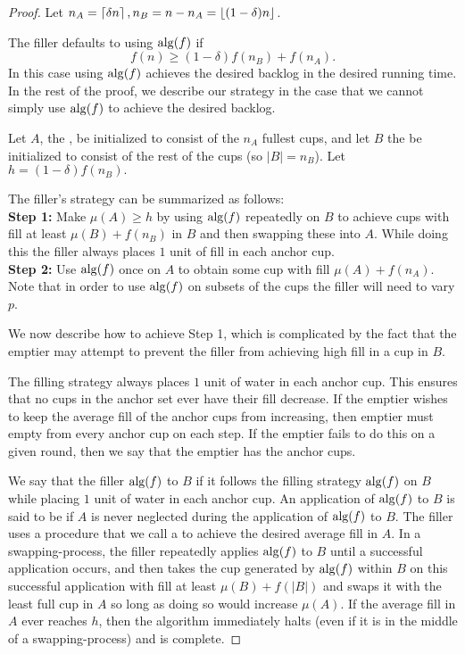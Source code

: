 \begin{proof}
  Let $n_A = \left\lceil \delta n \right\rceil, n_B = n-n_A = \left\lfloor (1-\delta) n \right\rfloor$.

  The filler defaults to using $\operatorname{\text{\textup{alg}}}(f)$ if 
  $$f(n) \ge (1-\delta)f(n_B) + f(n_A).$$ 
  In this case using $\operatorname{\text{\textup{alg}}}(f)$ achieves the desired backlog in
  the desired running time. In the rest of the proof, we describe
  our strategy in the case that we cannot simply use $\operatorname{\text{\textup{alg}}}(f)$ to
  achieve the desired backlog. 

  Let $A$, the , be initialized to consist of
  the $n_A$ fullest cups, and let $B$ the
   be initialized to consist of the rest of
  the cups (so $|B| = n_B$). Let $h = (1-\delta)f(n_B).$

  The filler's strategy can be summarized as follows: \\
  \textbf{Step 1:} Make $\mu(A) \ge h$ by using $\operatorname{\text{\textup{alg}}}(f)$
  repeatedly on $B$ to achieve cups with fill at least $\mu(B) +
  f(n_B)$ in $B$ and then swapping these into $A$. While doing
  this the filler always places $1$ unit of fill in each anchor
  cup.\\
  \textbf{Step 2:} Use $\operatorname{\text{\textup{alg}}}(f)$ once on $A$ to obtain some cup
  with fill $\mu(A)+f(n_A)$.\\
  Note that in order to use $\operatorname{\text{\textup{alg}}}(f)$ on subsets of the cups the
  filler will need to vary $p$.

  We now describe how to achieve Step 1, which is
  complicated by the fact that the emptier may attempt to
  prevent the filler from achieving high fill in a cup
  in $B$.

  The filling strategy always places $1$ unit of water in each
  anchor cup. This ensures that no cups in the anchor set ever
  have their fill decrease. If the emptier wishes to keep the
  average fill of the anchor cups from increasing, then emptier
  must empty from every anchor cup on each step. If the emptier
  fails to do this on a given round, then we say that the emptier
  has  the anchor cups. 

  We say that the filler  $\operatorname{\text{\textup{alg}}}(f)$ to $B$ if it
  follows the filling strategy $\operatorname{\text{\textup{alg}}}(f)$ on $B$ while placing $1$
  unit of water in each anchor cup. An application of $\operatorname{\text{\textup{alg}}}(f)$
  to $B$ is said to be  if $A$ is never
  neglected during the application of $\operatorname{\text{\textup{alg}}}(f)$ to $B$. The
  filler uses a procedure that we call a 
  to achieve the desired average fill in $A$. In a
  swapping-process, the filler repeatedly applies $\operatorname{\text{\textup{alg}}}(f)$ to
  $B$ until a successful application occurs, and then takes the
  cup generated by $\operatorname{\text{\textup{alg}}}(f)$ within $B$ on this successful
  application with fill at least $\mu(B) + f(|B|)$ and swaps it
  with the least full cup in $A$ so long as doing so would
  increase $\mu(A)$. If the average fill in $A$ ever reaches $h$,
  then the algorithm immediately halts (even if it is in the
  middle of a swapping-process) and is complete.


\end{proof}
